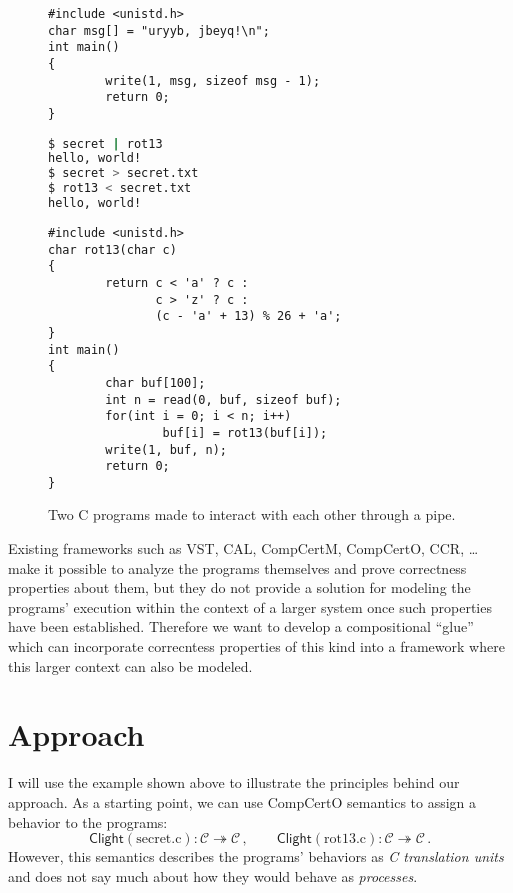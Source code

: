 \documentclass{report}
\begin{document}
\begin{figure}[h] %
\centering
\begin{minipage}{.40\textwidth}
\begin{lstlisting}[title={secret.c}]
#include <unistd.h>
char msg[] = "uryyb, jbeyq!\n";
int main()
{
        write(1, msg, sizeof msg - 1);
        return 0;
}
\end{lstlisting}
\vspace{1em}
\begin{lstlisting}[title={typescript},language=sh]
$ secret | rot13
hello, world!
$ secret > secret.txt
$ rot13 < secret.txt
hello, world!
\end{lstlisting}
\end{minipage}
\hspace{3em}
\begin{minipage}{.45\textwidth}
\begin{lstlisting}[title={rot13.c}]
#include <unistd.h>
char rot13(char c)
{
        return c < 'a' ? c :
               c > 'z' ? c :
               (c - 'a' + 13) % 26 + 'a';
}
int main()
{
        char buf[100];
        int n = read(0, buf, sizeof buf);
        for(int i = 0; i < n; i++)
                buf[i] = rot13(buf[i]);
        write(1, buf, n);
        return 0;
}
\end{lstlisting}
\end{minipage}
\caption{Two C programs made to interact with each other
  through a pipe.}
\label{fig:readwritehello}
\end{figure}

Existing frameworks such as
VST, CAL, CompCertM, CompCertO, CCR, \ldots
make it possible to analyze the programs themselves
and prove correctness properties about them,
but they do not provide a solution for
modeling the programs' execution within the context of a larger system
once such properties have been established.
Therefore we want to develop
a compositional ``glue'' which can
incorporate correcntess properties of this kind
into a framework where this larger context can also be modeled.


\section{Approach} %

I will use the example shown above
to illustrate the principles behind our approach.
As a starting point, we can use
CompCertO semantics to assign a behavior
to the programs:
\[
  \mathsf{Clight}(\mathrm{secret.c}) :
    \mathcal{C} \twoheadrightarrow \mathcal{C} \,,
  \qquad
  \mathsf{Clight}(\mathrm{rot13.c}) :
    \mathcal{C} \twoheadrightarrow \mathcal{C} \,.
\]
However,
this semantics describes the programs' behaviors
as \emph{C translation units}
and does not say much about how they would behave
as \emph{processes}.
\end{document}
